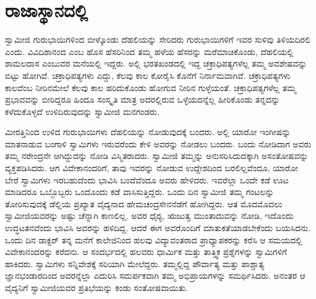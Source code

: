 
\chapter{ರಾಜಾಸ್ಥಾನದಲ್ಲಿ}

ಸ್ವಾಮೀಜಿ ಗುರುಭಾಯಿಗಳಿಂದ ಬೀಳ್ಕೊಂಡು ದೆಹಲಿಯನ್ನು ಸೇರಿದರು ಗುರುಭಾಯಿಗಳಿಗೆ ಇವರ ಸುಳಿವು ತಿಳಿಯದಿರಲಿ ಎಂದು. ವಿವಿದಿಶಾನಂದ ಎಂಬ ಹೊಸ ಹೆಸರಿನಿಂದ ತಮ್ಮ ಹಳೆಯ ಹೆಸರನ್ನು ಮರೆಮಾಚಿಕೊಂಡು, ದೆಹಲಿಯಲ್ಲಿ ಶಾಮಲದಾಸ ಎಂಬುವರ ಮನೆಯಲ್ಲಿ ಇದ್ದರು. ಅಲ್ಲಿ ಭರತಖಂಡದಲ್ಲಿ ಇದ್ದ ಚಕ್ರಾಧಿಪತ್ಯಗಳೆಲ್ಲ ತಮ್ಮ ಅವಶೇಷವನ್ನು ಬಿಟ್ಟು ಹೋಗಿವೆ. ಚಕ್ರಾಧಿಪತ್ಯಗಳು ಎದ್ದು, ಕೆಲವು ಕಾಲ ಕೋರೈಸಿ ಕೊನೆಗೆ ನಿರ್ನಾಮವಾಗಿವೆ. ಚಕ್ರಾಧಿಪತ್ಯಗಳು ಕಾಲವೆಂಬ ನೀರಿನಮೇಲೆ ಕೆಲವು ಕಾಲ ಹರಿದುಕೊಂಡು ಹೋಗುವ ನೀರಿನ ಗುಳ್ಳೆಯಂತೆ. ಚಕ್ರಾಧಿಪತ್ಯಗಳೆಲ್ಲ ತಮ್ಮ ಪ್ರಭಾವವನ್ನು ಬೀರಿದ್ದರೂ ಹಿಂದೂ ಸಂಸ್ಕೃತಿ ಮಾತ್ರ ಅದರಲ್ಲಿರುವ ಒಳ್ಳೆಯದನ್ನೆಲ್ಲ ಹೀರಿಕೊಂಡು ತನ್ನದನ್ನು ಕಳೆದುಕೊಳ್ಳದೆ ಉಳಿದಿರುವುದನ್ನು ಸ್ವಾಮೀಜಿ ಮನಗಂಡರು. 

ಮೀರತ್ತಿನಿಂದ ಉಳಿದ ಗುರುಭಾಯಿಗಳು ದೆಹಲಿಯನ್ನು ನೋಡುವುದಕ್ಕೆ ಬಂದರು. ಅಲ್ಲಿ ಯಾರೋ ಇಂಗೀಷನ್ನು ಮಾತನಾಡುವ ಬಂಗಾಳಿ ಸ್ವಾಮಿಗಳು ಇರುವರೆಂದು ಕೇಳಿ ಅವರನ್ನು ನೋಡಲು ಬಂದರು. ಬಂದು ನೋಡಿದಾಗ ಅವರು ತಮ್ಮ ನರೇಂದ್ರನೇ ಆಗಿದ್ದುದನ್ನು ನೋಡಿ ವಿಸ್ಮಿತರಾದರು. ಸ್ವಾಮೀಜಿ ತಮ್ಮನ್ನು ಅನುಸರಿಸಿದುದಕ್ಕಾಗಿ ಅಸಂತೋಷವನ್ನು ವ್ಯಕ್ತಪಡಿಸಿದರು. ಆಗ ವಿವೇಕಾನಂದರಿಗೆ, ತಾವು ಇವರನ್ನು ನೋಡುವ ಉದ್ದೇಶದಿಂದ ಬರಲಿಲ್ಲವೆಂದೂ, ಯಾರೋ ಬೇರೆ ಸ್ವಾಮಿಗಳು ಇರಬಹುದೆಂದು ಭಾವಿಸಿ ಬಂದೆವೆಂದೂ ಅವರು ಹೇಳಿದರು. ಇವರೆಲ್ಲಾ ಒಂದೇ ಕಡೆ ಊಟ ಮಾಡಿದರೂ ಒಬ್ಬೊಬ್ಬರು ಒಂದೊಂದು ಕಡೆ ವಾಸಿಸುತ್ತಿದ್ದರು. ಒಂದು ದಿನ ಸ್ವಾಮೀಜಿ ತಮ್ಮ ಗಂಟಲನ್ನು ತೋರಿಸುವುದಕ್ಕೆ ಡೆಲ್ಲಿಯ ಪ್ರಖ್ಯಾತ ವೈದ್ಯನಾದ ಹೇಮಚಂದ್ರಸೇನನೆಡೆಗೆ ಹೋಗಿದ್ದರು. ಆತ ಮೊದಮೊದಲು ಸ್ವಾಮೀಜಿಯವರನ್ನು ಅಷ್ಟು ಚೆನ್ನಾಗಿ ಕಾಣಲಿಲ್ಲ. ಅವರ ಧೈರ‍್ಯ, ಋಜುತ್ವ ಮುಂತಾದುವನ್ನು ನೋಡಿ, ಇದೊಂದು ಉದ್ಧಟತನವೆಂದು ಭಾವಿಸಿ ಅವರನ್ನು ಹಳಿದಿದ್ದ. ಆದರೆ ಈಗ ಅವರೊಂದಿಗೆ ಮಾತುಕತೆಯಾಡಬೇಕೆಂದು ಬಯಸಿದನು. ಒಂದು ದಿನ ಡಾಕ್ಟರ್ ತನ್ನ ಮನೆಗೆ ಕಾಲೇಜಿನಿಂದ ಹಲವು ವಿದ್ಯಾವಂತರಾದ ಪ್ರಾಧ್ಯಾಪಕರನ್ನು ಕರೆಸಿ ಆ ಸಮಯದಲ್ಲಿ ವಿವೇಕಾನಂದರನ್ನು ಕರೆದನು. ಆ ಸಂದರ್ಭದಲ್ಲಿ ಹಲವರು ಧಾರ್ಮಿಕ ಮತ್ತು ತಾತ್ತ್ವಿಕ ಪ್ರಶ್ನೆಗಳನ್ನು ಸ್ವಾಮಿಗಳಿಗೆ ಹಾಕಿದರು. ಸ್ವಾಮಿಗಳು ಸನ್ನಿವೇಶಕ್ಕೆ ಸರಿಯಾಗಿ ಮೇಲೆದ್ದರು. ತಮ್ಮಲ್ಲಿದ್ದ ಪೌರ್ವಾತ್ಯ ಮತ್ತು ಪಾಶ್ಚಾತ್ಯ ಜ್ಞಾನಭಂಡಾರದಿಂದ ಅವರನ್ನೆಲ್ಲಾ ಎದುರಿಸಿ ಸಮರ್ಪಕವಾಗಿ ತಮ್ಮ ಅಭಿಪ್ರಾಯಗಳನ್ನು ಸಮರ್ಥಿಸಿದರು. ಅನಂತರ ಆ ವೈದ್ಯನಿಗೆ ಸ್ವಾಮೀಜಿಯವರ ಪ್ರತಿಭೆಯನ್ನು ಕಂಡು ಸಂತೋಷವಾಯಿತು. 

